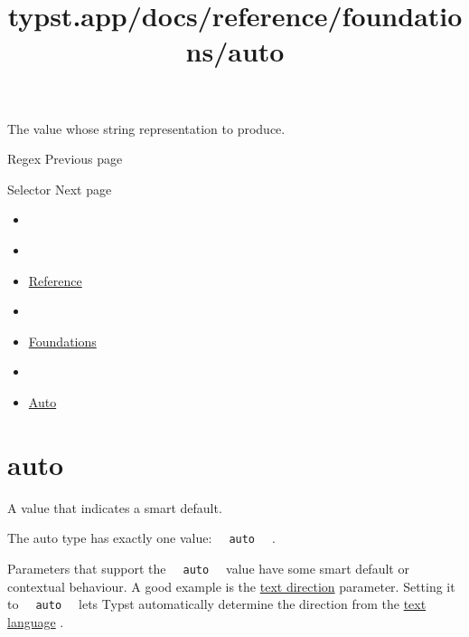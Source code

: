 The value whose string representation to produce.

\href{/docs/reference/foundations/regex/}{\pandocbounded{}}

{ Regex } { Previous page }

\href{/docs/reference/foundations/selector/}{\pandocbounded{}}

{ Selector } { Next page }


\title{typst.app/docs/reference/foundations/auto}

\begin{itemize}
\tightlist
\item
  \href{/docs}{}
\item
  
\item
  \href{/docs/reference/}{Reference}
\item
  
\item
  \href{/docs/reference/foundations/}{Foundations}
\item
  
\item
  \href{/docs/reference/foundations/auto/}{Auto}
\end{itemize}

\section{\texorpdfstring{{ auto }}{ auto }}\label{summary}

A value that indicates a smart default.

The auto type has exactly one value:
\texttt{\ }{\texttt{\ auto\ }}\texttt{\ } .

Parameters that support the \texttt{\ }{\texttt{\ auto\ }}\texttt{\ }
value have some smart default or contextual behaviour. A good example is
the \href{/docs/reference/text/text/\#parameters-dir}{text direction}
parameter. Setting it to \texttt{\ }{\texttt{\ auto\ }}\texttt{\ } lets
Typst automatically determine the direction from the
\href{/docs/reference/text/text/\#parameters-lang}{text language} .

\href{/docs/reference/foundations/assert/}{\pandocbounded{}}

